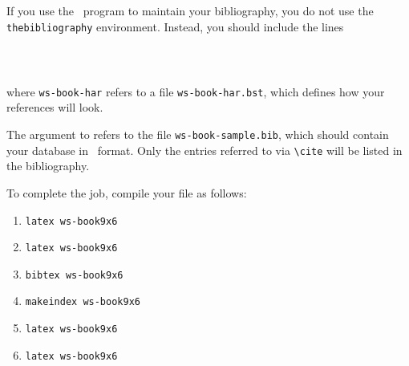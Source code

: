 \section{\btex}\index{\btex}
If you use the \btex\ program to maintain your bibliography, you do
not use the \verb|thebibliography| environment. Instead, you should
include the lines

\begin{verbatim}
   
   
\end{verbatim}

\noindent where \verb|ws-book-har| refers to a file
\verb|ws-book-har.bst|, which defines how your references will look.

The argument to \verb|| refers to the file \verb|ws-book-sample.bib|,
which should contain your database in \btex\ format. Only the
entries referred to via \verb|\cite| will be listed in the
bibliography.

To complete the job, compile your file as follows:

\begin{enumerate}[(6)]
\item \verb|latex ws-book9x6|
\item \verb|latex ws-book9x6|
\item \verb|bibtex ws-book9x6|
\item \verb|makeindex ws-book9x6|
\item \verb|latex ws-book9x6|
\item \verb|latex ws-book9x6|
\end{enumerate}

